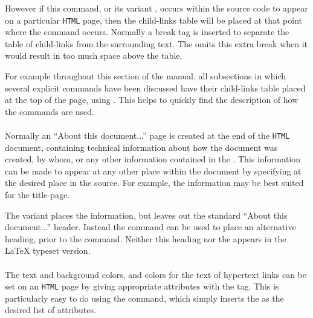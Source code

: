 However if this command, or its variant ,
occurs within the source code to appear on a particular \texttt{HTML} page,
then the child-links table will be placed at that point
where the command occurs. 
Normally a break tag  is inserted to separate the table of child-links 
from the surrounding text. The  omits this extra break
when it would result in too much space above the table.

For example throughout this section of the manual, 
all subsections in which several explicit commands have been discussed
have their child-links table placed at the top of the page,
using . 
This helps to quickly find the description of how the commands are used.%


%
\paragraph*{\label{htmlinfo}}
Normally an ``About this document...'' page is created at the end
of the \texttt{HTML} document, containing technical information
about how the document was created, by whom, or any other information
contained in the  .
This information can be made to appear at any other place within the document 
by specifying  at the desired place in the source.
For example, the information may be best suited for the title-page.

The variant  places the information, but leaves out the 
standard ``About this document...'' header. 
Instead the  command 
can be used to place an alternative heading, prior to the  command.
Neither this heading nor the   appears 
in the \LaTeX{} typeset version.%


%
\paragraph*{\texttt{}\label{bodytext}}
The text and background colors, and colors for the text of hypertext links can
be set on an \texttt{HTML} page by giving appropriate attributes 
with the  tag. This is particularly easy to do
using the  command, 
which simply inserts the  as the desired list of attributes.%

